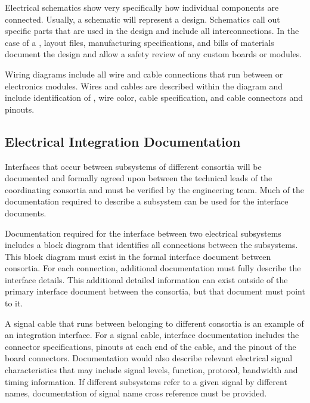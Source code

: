 Electrical schematics show very specifically how individual
components are connected.  Usually, a schematic will represent a
 design.  Schematics call out specific
parts that are used in the design and include all interconnections.
In the case of a , layout files, manufacturing
specifications, and bills of materials document
the design and allow a safety review of any custom boards or
modules.


Wiring diagrams include all wire and cable connections that run
between  or electronics modules.  Wires and
cables are described within the diagram and include identification of
, wire color, cable specification, and
cable connectors and pinouts.


\subsection{Electrical Integration Documentation}
\label{sec:fdsp-coord-integ-electrical}

Interfaces that occur between subsystems of different consortia will
be documented and formally agreed upon between the technical leads of
the coordinating consortia and must be verified by the  engineering 
team.  Much of the documentation required to describe a subsystem can
be used for the interface documents.

Documentation required for the interface between two electrical
subsystems includes a block diagram that identifies all connections
between the subsystems.  This block diagram must exist in the formal
interface document between consortia.  For each connection, additional
documentation must fully describe the interface details. This
additional detailed information can exist outside of the primary
interface document between the consortia, but that document must point
to it.


A signal cable that runs between  belonging to different
consortia is an example of an integration interface.  For a signal
cable, interface documentation includes the connector specifications,
pinouts at each end of the cable, and the pinout of the board
connectors.  Documentation would also describe relevant electrical
signal characteristics that may include signal levels, function,
protocol, bandwidth and timing information.  If different subsystems
refer to a given signal by different names, documentation of signal
name cross reference must be provided.

